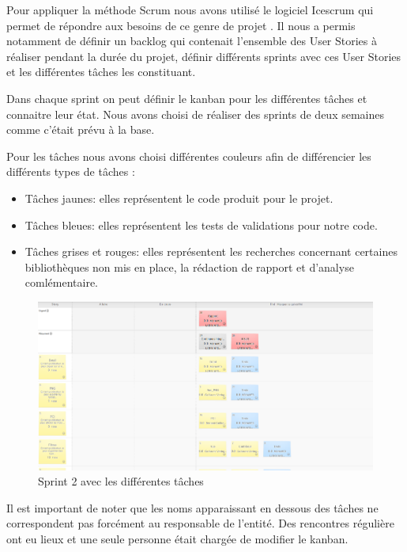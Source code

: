 \documentclass [a4paper,11pt]{article}
\begin{document}
Pour appliquer la méthode Scrum nous avons utilisé le logiciel Icescrum qui permet de répondre aux besoins de ce genre de projet \cite{ICESCRUM}. Il nous a permis notamment de définir un backlog qui contenait l'ensemble des User Stories à réaliser pendant la durée du projet, définir différents sprints avec ces User Stories et les différentes tâches les constituant. 
\newline

Dans chaque sprint on peut définir le kanban pour les différentes tâches et connaitre leur état. Nous avons choisi de réaliser des sprints de deux semaines comme c'était prévu à la base.
\newline

Pour les tâches nous avons choisi différentes couleurs afin de différencier les différents types de tâches :
\newline

\begin{itemize}
\item Tâches jaunes: elles représentent le code produit pour le projet.
\item Tâches bleues: elles représentent les tests de validations pour notre code.
\item Tâches grises et rouges: elles représentent les recherches concernant certaines bibliothèques non mis en place, la rédaction de rapport et d'analyse comlémentaire.
\end{itemize}

\begin{figure}[!h]
\centering
\includegraphics[scale=0.3]{img/icescrum.png}
\caption[Scrum]{Sprint 2 avec les différentes tâches}
\end{figure}

Il est important de noter que les noms apparaissant en dessous des tâches ne correspondent pas forcément au responsable de l'entité. Des rencontres régulière ont eu lieux et une seule personne était chargée de modifier le kanban.
\end{document}
